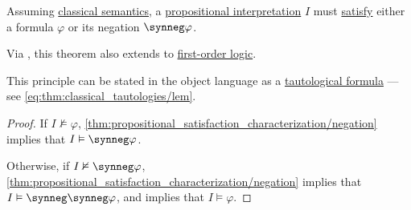 \begin{theorem}\label{thm:propositional_semantic_lem}
  Assuming \hyperref[def:truth_value_algebra/classical]{classical semantics}, a \hyperref[def:propositional_interpretation]{propositional interpretation} \( I \) must \hyperref[def:propositional_semantics/satisfaction]{satisfy} either a formula \( \varphi \) or its negation \( \synneg \varphi \).
\end{theorem}
\begin{comments}
  \item Via , this theorem also extends to \hyperref[def:first_order_logic]{first-order logic}.

  \item This principle can be stated in the object language as a \hyperref[def:tautology]{tautological formula} --- see \eqref{eq:thm:classical_tautologies/lem}.
\end{comments}
\begin{proof}
  If \( I \nvDash \varphi \), \cref{thm:propositional_satisfaction_characterization/negation} implies that \( I \vDash \synneg \varphi \).

  Otherwise, if \( I \nvDash \synneg \varphi \), \cref{thm:propositional_satisfaction_characterization/negation} implies that \( I \vDash \synneg \synneg \varphi \), and  implies that \( I \vDash \varphi \).
\end{proof}

